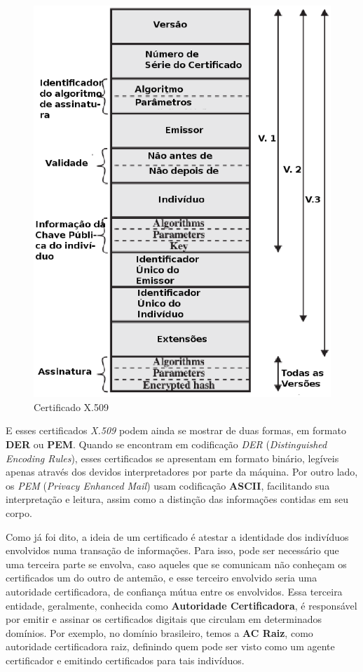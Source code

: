 	\begin{figure}[h]
		\centering
		\includegraphics[keepaspectratio=true,scale=0.7]{figuras/img04.eps}
		\caption{Certificado X.509 \cite[p.~431]{stallings11}}
		\label{img07}
	\end{figure}

	E esses certificados \textit{X.509} podem ainda se mostrar de duas formas, em formato \textbf{DER} ou \textbf{PEM}. Quando se encontram em codificação \textit{DER} (\textit{Distinguished Encoding Rules}), esses certificados se apresentam em formato binário, legíveis apenas através dos devidos interpretadores por parte da máquina. Por outro lado, os \textit{PEM} (\textit{Privacy Enhanced Mail}) usam codificação \textbf{ASCII}, facilitando sua interpretação e leitura, assim como a distinção das informações contidas em seu corpo.

	Como já foi dito, a ideia de um certificado é atestar a identidade dos indivíduos envolvidos numa transação de informações. Para isso, pode ser necessário que uma terceira parte se envolva, caso aqueles que se comunicam não conheçam os certificados um do outro de antemão, e esse terceiro envolvido seria uma autoridade certificadora, de confiança mútua entre os envolvidos. Essa terceira entidade, geralmente, conhecida como \textbf{Autoridade Certificadora}, é responsável por emitir e assinar os certificados digitais que circulam em determinados domínios. Por exemplo, no domínio brasileiro, temos a \textbf{AC Raiz}, como autoridade certificadora raiz, definindo quem pode ser visto como um agente certificador e emitindo certificados para tais indivíduos.

